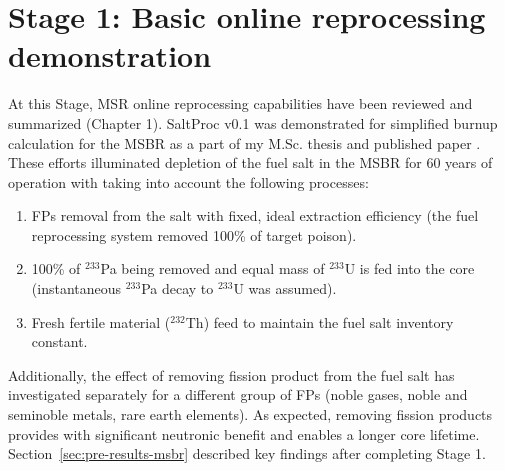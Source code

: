 \section{Stage 1: Basic online reprocessing demonstration}
At this Stage, \gls{MSR} online reprocessing capabilities have been reviewed 
and summarized (Chapter 1). SaltProc v0.1 was demonstrated for simplified 
burnup calculation for the \gls{MSBR} as a part of my M.Sc. thesis  
\cite{rykhlevskii_advanced_2018} and published paper  
\cite{rykhlevskii_modeling_2019}. These efforts illuminated depletion of the 
fuel salt in the \gls{MSBR} for 60 years of operation with taking into account 
the following processes:
\begin{enumerate}
	\item \glspl{FP} removal from the salt with fixed, ideal extraction 
	efficiency (the fuel reprocessing system removed 100\% of target poison).
	\item 100\% of $^{233}$Pa being removed and equal mass of $^{233}$U is fed 
	into the core (instantaneous $^{233}$Pa decay to $^{233}$U was assumed).
	\item Fresh fertile material ($^{232}$Th) feed to maintain the fuel salt 
	inventory constant.
\end{enumerate}
Additionally, the effect of removing fission product from the fuel salt has 
investigated separately for a different group of \glspl{FP} (noble gases, 
noble and seminoble metals, rare earth elements). As expected, removing  
fission products provides with significant neutronic benefit and enables a 
longer core lifetime. Section~\ref{sec:pre-results-msbr} described key 
findings after completing Stage 1.

